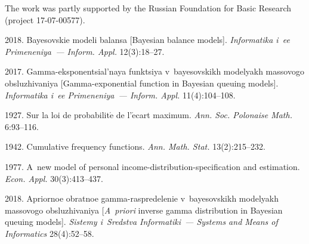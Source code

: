 




\Ack
\noindent
The work was partly supported by the Russian Foundation for Basic Research 
(project 17-07-00577).

\pagebreak



  \begin{multicols}{2}

\renewcommand{\bibname}{\protect\rmfamily References}

{\small\frenchspacing
 {%
 \begin{thebibliography}{9}
 2018. Bayesovskie modeli balansa 
[Bayesian balance models]. \textit{Informatika i~ee Primeneniya~--- Inform. Appl.}
12(3):18--27.

 2017. Gamma-eksponentsial'naya 
funktsiya v~bayesovskikh modelyakh massovogo obsluzhivaniya 
[Gamma-exponential function in Bayesian queuing models]. 
\textit{Informatika i~ee Primeneniya~--- Inform. Appl.} 11(4):104--108.

 1927. 
Sur la loi de probabilit$\acute{\mbox{e}}$ de l'$\acute{\mbox{e}}$cart maximum. 
\textit{Ann. Soc. Polonaise 
Math.} 6:93--116.

\columnbreak

 1942. Cumulative frequency functions. 
\textit{Ann. Math. Stat.} 13(2):215--232.

 1977. 
A~new model of personal income-distribution-specification and estimation. 
\textit{Econ. Appl.} 30(3):413--437.

2018. Apriornoe obratnoe gamma-raspredelenie v~bayesovskikh modelyakh 
massovogo obsluzhivaniya 
[\textit{A~priori} inverse gamma distribution in Bayesian queuing models]. 
\textit{Sistemy i~Sredstva Informatiki~--- Systems and Means of Informatics}
28(4):52--58.
\end{thebibliography}

 }
 }

\end{multicols}

